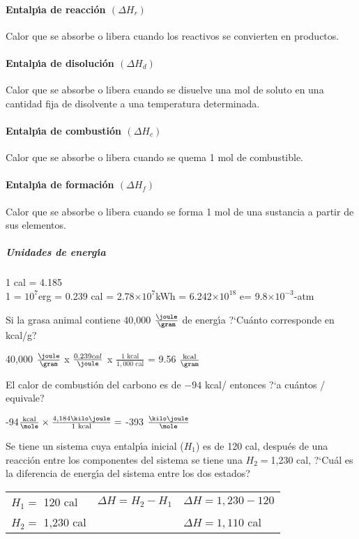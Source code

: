 \paragraph{Entalp\'{\i}a de reacci\'on $(\Delta H_r)$}
Calor que se absorbe o libera cuando los reactivos se convierten en
productos.
\paragraph{Entalp\'{\i}a de disoluci\'on $(\Delta H_d)$}
Calor que se absorbe o libera cuando se di\-suelve una mol de soluto
en una cantidad fija de disolvente a una temperatura determinada.
\paragraph{Entalp\'{\i}a de combusti\'on $(\Delta H_c)$}
Calor que se absorbe o libera cuando se quema 1 mol de combustible.
\paragraph{Entalp\'{\i}a de formaci\'on $(\Delta H_f)$}
Calor que se absorbe o libera cuando se forma 1 mol de una sustancia a
partir de sus elementos.
\subparagraph{Unidades de energ\'{\i}a}

1 cal = 4.185 \joule\\
{\small 1 \joule = $10^7$erg = 0.239 cal = 2.78$\times10^7$kWh =
6.242$\times10^{18}$ e\volt = 9.8$\times10^{-3}$\liter-atm}

\begin{example}
Si la grasa animal contiene 40,000 $\frac{\joule}{\gram}$ de energ\'{\i}a  ?`Cu\'anto corresponde en kcal/g?

 40,000 $\frac{\joule}{\gram}$ x  $\frac{0.239 cal}{\joule}$ x $\frac{1 \textrm{ kcal}}{1,000
\textrm{ cal}}$ = 9.56 $\frac{\textrm{kcal}}{\gram}$
\end{example}

\begin{example}
 El calor de combusti\'on del carbono es de $-94$ {kcal/\mole} entonces ?`a cu\'an\-tos  {\kilo\joule/\mole} equivale?

\hskip 1in -94$\frac{\textrm{kcal}}{\mole}\times\frac{4,184 \kilo\joule}{1  \textrm{ kcal}} =$ -393
$\frac{\kilo\joule}{\mole}$
\end{example}
\begin{example}
Se tiene un sistema cuya entalp\'{\i}a inicial ($H_1$) es de 120 cal, despu\'es de una
reacci\'on entre los componentes del sistema se tiene una $H_2=$1,230 cal, ?`Cu\'al es la
diferencia de energ\'{\i}a del sistema entre los dos estados? 

\begin{tabular}{lll}
$H_1=$ 120 cal & $\Delta H = H_2 -H_1$ &$\Delta H = 1,230 -120$ \\
$H_2=$ 1,230 cal && $\Delta H = 1,110$ cal
\end{tabular}
\end{example}

